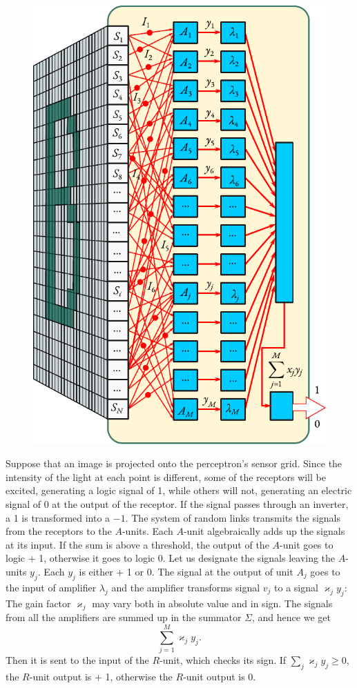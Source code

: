 \begin{figure}[ht]
 \centering
 \includegraphics[width=.68\linewidth]{figures/perceptron2.pdf}
 \end{figure}
 
Suppose that an image is projected onto the perceptron's sensor grid.
Since the intensity of the light at each point is different, some of the
receptors will be excited, generating a logic signal of 1, while others will
not, generating an electric signal of 0 at the output of the receptor. If the
signal passes through an inverter, a 1 is transformed into a $-1$. The
system of random links transmits the signals from the receptors to the
$A$-units. Each $A$-unit algebraically adds up the signals at its input. If the
sum is above a threshold, the output of the $A$-unit goes to logic + 1,
otherwise it goes to logic 0. Let us designate the signals leaving the
$A$-units $y_{j}$. Each $y_{j}$ is either + 1 or 0. The signal at the output of unit $A_{j}$ goes to the input of amplifier $\lambda_{j}$ and the amplifier transforms signal $v_{j}$ to a signal $\varkappa_{j} y_{j}$: The gain factor $\varkappa_{j}$ may vary both in absolute value and in sign. The signals from all the amplifiers are summed up in the summator $\Sigma$, and hence we get 
\begin{equation*}%
\sum_{j= 1}^{M} \varkappa_{j} y_{j}.
\end{equation*}
Then it is sent to the input of the $R$-unit, which checks its sign. If
$\sum_{j} \varkappa_{j} y_{j} \geqslant 0$, the $R$-unit output is + 1, otherwise the $R$-unit output is 0.


